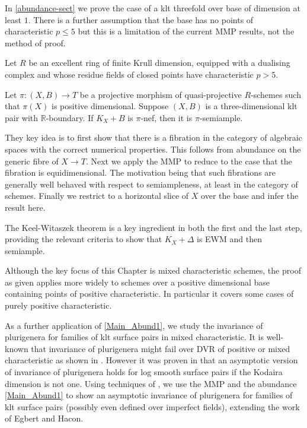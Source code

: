 \documentclass[a4paper,12pt]{book}
\begin{document}
	In \autoref{abundance-sect} we prove the case of a klt threefold over base of dimension at least $1$. There is a further assumption that the base has no points of characteristic $p \leq 5$ but this is a limitation of the current MMP results, not the method of proof.
	
	\begin{theo}\label{Main_Abund1}
		Let $R$ be an excellent ring of finite Krull dimension, equipped with a dualising complex and whose residue fields of closed points have characteristic $p>5$.
		
		Let $\pi \colon (X,B) \to T$ be a projective morphism of quasi-projective $R$-schemes such that $\pi(X)$ is positive dimensional.
		Suppose $(X,B)$ is a three-dimensional klt pair with $\mathbb{R}$-boundary. If $K_X+B$ is $\pi$-nef, then it is $\pi$-semiample.
	\end{theo}
	
	They key idea is to first show that there is a fibration in the category of algebraic spaces with the correct numerical properties. This follows from abundance on the generic fibre of $X \to T$. Next we apply the MMP to reduce to the case that the fibration is equidimensional. The motivation being that such fibrations are generally well behaved with respect to semiampleness, at least in the category of schemes. Finally we restrict to a horizontal slice of $X$ over the base and infer the result here.
	
	The Keel-Witaszek theorem is a key ingredient in both the first and the last step, providing the relevant criteria to show that $K_{X}+\Delta$ is EWM and then semiample.
	
	Although the key focus of this Chapter is mixed characteristic schemes, the proof as given applies more widely to schemes over a positive dimensional base containing points of positive characteristic. In particular it covers some cases of purely positive characteristic.
	
	As a further application of \autoref{Main_Abund1}, we study the invariance of plurigenera for families of klt surface pairs in mixed characteristic.
	It is well-known that invariance of plurigenera might fail over DVR of positive or mixed characteristic as shown in \cite{KU, Suh08, Bri20}.
	However it was proven in \cite{EH} that an asymptotic version of invariance of plurigenera holds for log smooth surface pairs if the Kodaira dimension is not one.
	Using techniques of \cite{HMX18}, we use the MMP and the abundance \autoref{Main_Abund1} to show an asymptotic invariance of plurigenera for families of klt surface pairs (possibly even defined over imperfect fields), extending the work of Egbert and Hacon.
	
\end{document}
